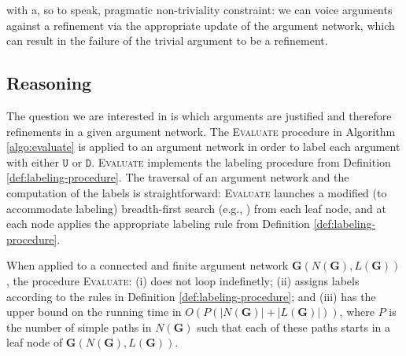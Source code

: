 \documentclass[10pt, conference, compsocconf]{IEEEtran}
\begin{document}
with a, so to speak, pragmatic non-triviality constraint: we can voice arguments against a refinement via the appropriate update of the argument network, which can result in the failure of the trivial argument to be a refinement.





\subsection{Reasoning}\label{sect:nlref:reasoning}
The question we are interested in is which arguments are justified and therefore refinements in a given argument network. The \textsc{Evaluate} procedure in Algorithm \ref{algo:evaluate} is applied to an argument network in order to label each argument with either $\texttt{U}$ or $\texttt{D}$. \textsc{Evaluate} implements the labeling procedure from Definition \ref{def:labeling-procedure}. The traversal of an argument network and the computation of the labels is straightforward: \textsc{Evaluate} launches a modified (to accommodate labeling) breadth-first search (e.g., \cite{Knuth:1997}) from each leaf node, and at each node applies the appropriate labeling rule from Definition \ref{def:labeling-procedure}.

\begin{proposition}
When applied to a connected and finite argument network $\textbf{G}(N(\textbf{G}), L(\textbf{G}))$, the procedure \textsc{Evaluate}: (i) does not loop indefinetly; (ii) assigns labels according to the rules in Definition \ref{def:labeling-procedure}; and (iii) has the upper bound on the running time in $O(P(|N(\textbf{G})| + |L(\textbf{G})|))$, where $P$ is the number of simple paths in $N(\textbf{G})$ such that each of these paths starts in a leaf node of $\textbf{G}(N(\textbf{G}), L(\textbf{G}))$.
\end{proposition}
\end{document}

